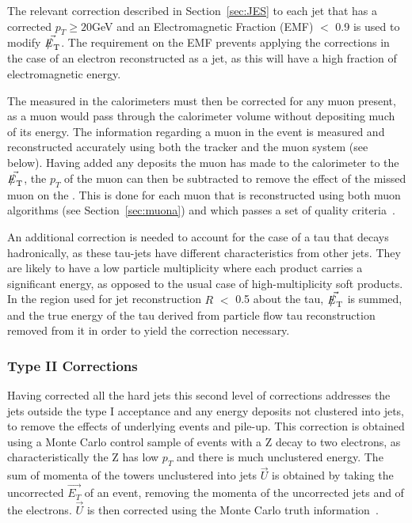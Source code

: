  The relevant correction described in Section~\ref{sec:JES} to each jet that has a corrected $p_{T} \geq 20 $GeV and an Electromagnetic Fraction (EMF) $<$ 0.9 is used to modify $\vec{\met}$. The requirement on the EMF prevents applying the corrections in the case of an electron reconstructed as a jet, as this will have a high fraction of electromagnetic  energy.

The \met measured in the calorimeters must then be corrected for any muon present, as a muon would pass through the calorimeter volume without depositing much of its energy. The information regarding a muon in the event is measured and reconstructed accurately using both the tracker and the muon system (see below). Having added any deposits the muon has made to the calorimeter to the $\vec{\met}$, the $p_{T}$ of the muon can then be subtracted to remove the effect of the missed muon on the \met. This is done for each muon that is reconstructed using both muon algorithms (see Section~\ref{sec:muona}) and which passes a set of quality criteria~\cite{etmissnote}. 

An additional correction is needed to account for the case of a tau that decays hadronically, as these tau-jets have different characteristics from other jets. They are likely to have a low particle multiplicity where each product carries a significant energy, as opposed to the usual case of high-multiplicity soft products. In the region used for jet reconstruction $R$ $<$ 0.5 about the tau, $\vec{\met}$ is summed, and the true energy of the tau derived from particle flow tau reconstruction removed from it in order to yield the correction necessary.  

\subsubsection{Type II Corrections}

Having corrected all the hard jets this second level of corrections addresses the jets outside the type I acceptance and any energy deposits not clustered into jets, to remove the effects of underlying events and pile-up. This correction is obtained using a Monte Carlo control sample of events with a Z decay to two electrons, as characteristically the Z has low $p_{T}$ and there is much unclustered energy. The sum of momenta of the towers unclustered into jets $\vec{U}$ is obtained by taking the uncorrected $\vec{E_{T}}$ of an event, removing the momenta of the uncorrected jets and of the electrons. $\vec{U}$ is then corrected using the Monte Carlo truth information~\cite{JME-10-004}. 


